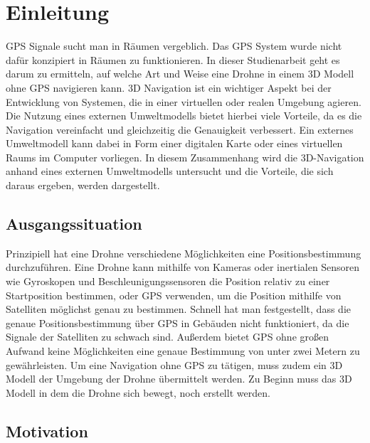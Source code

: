 \chapter{Einleitung}

\ac{GPS} Signale sucht man in Räumen vergeblich. Das \ac{GPS} System wurde nicht dafür konzipiert in Räumen zu funktionieren.
In dieser Studienarbeit geht es darum zu ermitteln, auf welche Art und Weise eine Drohne in einem 3D Modell ohne \ac{GPS} navigieren kann.
3D Navigation ist ein wichtiger Aspekt bei der Entwicklung von Systemen, die in einer virtuellen oder realen Umgebung agieren. Die Nutzung eines externen Umweltmodells bietet hierbei viele Vorteile, da es die Navigation vereinfacht und gleichzeitig die Genauigkeit verbessert. Ein externes Umweltmodell kann dabei in Form einer digitalen Karte oder eines virtuellen Raums im Computer vorliegen. In diesem Zusammenhang wird die 3D-Navigation anhand eines externen Umweltmodells untersucht und die Vorteile, die sich daraus ergeben, werden dargestellt.



\section{Ausgangssituation}

Prinzipiell hat eine Drohne verschiedene Möglichkeiten eine Positionsbestimmung durchzuführen.
Eine Drohne kann mithilfe von Kameras oder inertialen Sensoren wie Gyroskopen und Beschleunigungssensoren die Position relativ zu einer Startposition bestimmen, oder \ac{GPS} verwenden, um die Position mithilfe von Satelliten möglichst genau zu bestimmen.
Schnell hat man festgestellt, dass die genaue Positionsbestimmung über \ac{GPS} in Gebäuden nicht funktioniert, da die Signale der Satelliten zu schwach sind. Außerdem bietet \ac{GPS} ohne großen Aufwand keine Möglichkeiten eine genaue Bestimmung von unter zwei Metern zu gewährleisten.
Um eine Navigation ohne GPS zu tätigen, muss zudem ein 3D Modell der Umgebung der Drohne übermittelt werden.
Zu Beginn muss das 3D Modell in dem die Drohne sich bewegt, noch erstellt werden.


\section{Motivation}


